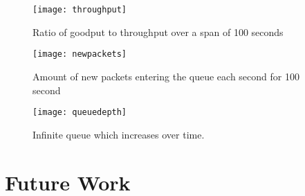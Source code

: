 \documentclass{article}
\begin{document}
\begin{figure}[H]
\texttt{[image: throughput]}
\centering
\caption{Ratio of goodput to throughput over a span of 100 seconds}
\end{figure}

\begin{figure}[H]
	\texttt{[image: newpackets]}
	\centering
	\caption{Amount of new packets entering the queue each second for 100 second}
\end{figure}

\begin{figure}[H]
	\texttt{[image: queuedepth]}
	\centering
	\caption{Infinite queue which increases over time.}
\end{figure}

\section{Future Work}
\end{document}
